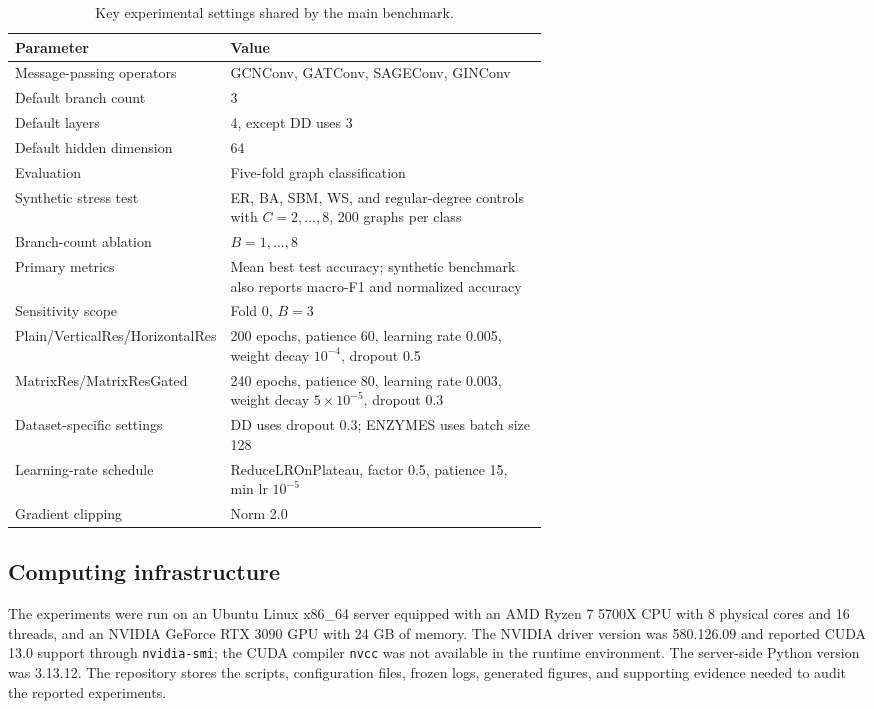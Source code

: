 \begin{table}[!htbp]
\centering
\small
\caption{Key experimental settings shared by the main benchmark.}
\label{tab:hyperparams}
\begin{tabular}{l p{0.62\linewidth}}
\toprule
Parameter & Value \\
\midrule
Message-passing operators & GCNConv, GATConv, SAGEConv, GINConv \\
Default branch count & 3 \\
Default layers & 4, except DD uses 3 \\
Default hidden dimension & 64 \\
Evaluation & Five-fold graph classification \\
Synthetic stress test & ER, BA, SBM, WS, and regular-degree controls with \(C=2,\ldots,8\), 200 graphs per class \\
Branch-count ablation & \(B=1,\ldots,8\) \\
Primary metrics & Mean best test accuracy; synthetic benchmark also reports macro-F1 and normalized accuracy \\
Sensitivity scope & Fold 0, \(B=3\) \\
Plain/VerticalRes/HorizontalRes & 200 epochs, patience 60, learning rate 0.005, weight decay \(10^{-4}\), dropout 0.5 \\
MatrixRes/MatrixResGated & 240 epochs, patience 80, learning rate 0.003, weight decay \(5\times10^{-5}\), dropout 0.3 \\
Dataset-specific settings & DD uses dropout 0.3; ENZYMES uses batch size 128 \\
Learning-rate schedule & ReduceLROnPlateau, factor 0.5, patience 15, min lr \(10^{-5}\) \\
Gradient clipping & Norm 2.0 \\
\bottomrule
\end{tabular}
\end{table}

\subsection{Computing infrastructure}

The experiments were run on an Ubuntu Linux x86\_64 server equipped with an AMD Ryzen 7 5700X CPU with 8 physical cores and 16 threads, and an NVIDIA GeForce RTX 3090 GPU with 24 GB of memory. The NVIDIA driver version was 580.126.09 and reported CUDA 13.0 support through \texttt{nvidia-smi}; the CUDA compiler \texttt{nvcc} was not available in the runtime environment. The server-side Python version was 3.13.12. The repository stores the scripts, configuration files, frozen logs, generated figures, and supporting evidence needed to audit the reported experiments.

